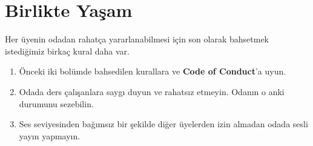\documentclass{article}
\begin{document}
\section{Birlikte Yaşam}
Her üyenin odadan rahatça yararlanabilmesi için son olarak bahsetmek istediğimiz birkaç kural daha var.
\begin{enumerate}
    \item 	Önceki iki bolümde bahsedilen kurallara ve \textbf{Code of Conduct}’a uyun.
    \item Odada ders çalışanlara saygı duyun ve rahatsız etmeyin. Odanın o anki durumunu sezebilin.
    \item Ses seviyesinden bağımsız bir şekilde diğer üyelerden izin almadan odada sesli yayın yapmayın.
\end{enumerate}
\end{document}
